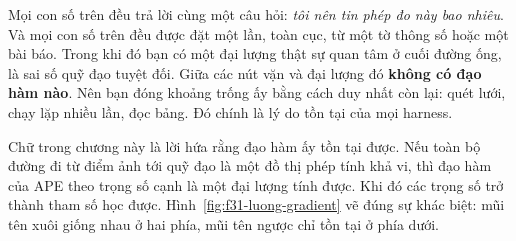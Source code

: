 \documentclass[../../deep_learning.tex]{subfiles}
\begin{document}
Mọi con số trên đều trả lời cùng một câu hỏi: \emph{tôi nên tin phép đo này bao nhiêu}. Và mọi con số trên đều được đặt một lần, toàn cục, từ một tờ thông số hoặc một bài báo. Trong khi đó bạn có một đại lượng thật sự quan tâm ở cuối đường ống, là sai số quỹ đạo tuyệt đối. Giữa các nút vặn và đại lượng đó \textbf{không có đạo hàm nào}. Nên bạn đóng khoảng trống ấy bằng cách duy nhất còn lại: quét lưới, chạy lặp nhiều lần, đọc bảng. Đó chính là lý do tồn tại của mọi  harness.

Chữ  trong chương này là lời hứa rằng đạo hàm ấy tồn tại được. Nếu toàn bộ đường đi từ điểm ảnh tới quỹ đạo là một đồ thị phép tính khả vi, thì đạo hàm của APE theo trọng số cạnh là một đại lượng tính được. Khi đó các trọng số trở thành tham số học được. Hình~\ref{fig:f31-luong-gradient} vẽ đúng sự khác biệt: mũi tên xuôi giống nhau ở hai phía, mũi tên ngược chỉ tồn tại ở phía dưới.
\end{document}
